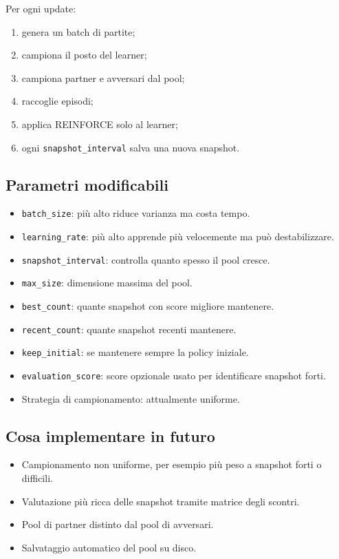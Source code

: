 \documentclass[11pt,a4paper]{article}
\begin{document}
Per ogni update:

\begin{enumerate}
  \item genera un batch di partite;
  \item campiona il posto del learner;
  \item campiona partner e avversari dal pool;
  \item raccoglie episodi;
  \item applica REINFORCE solo al learner;
  \item ogni \texttt{snapshot\_interval} salva una nuova snapshot.
\end{enumerate}

\subsection{Parametri modificabili}

\begin{itemize}
  \item \texttt{batch\_size}: più alto riduce varianza ma costa tempo.
  \item \texttt{learning\_rate}: più alto apprende più velocemente ma può
  destabilizzare.
  \item \texttt{snapshot\_interval}: controlla quanto spesso il pool cresce.
  \item \texttt{max\_size}: dimensione massima del pool.
  \item \texttt{best\_count}: quante snapshot con score migliore mantenere.
  \item \texttt{recent\_count}: quante snapshot recenti mantenere.
  \item \texttt{keep\_initial}: se mantenere sempre la policy iniziale.
  \item \texttt{evaluation\_score}: score opzionale usato per identificare
  snapshot forti.
  \item Strategia di campionamento: attualmente uniforme.
\end{itemize}

\subsection{Cosa implementare in futuro}

\begin{itemize}
  \item Campionamento non uniforme, per esempio più peso a snapshot forti o
  difficili.
  \item Valutazione più ricca delle snapshot tramite matrice degli scontri.
  \item Pool di partner distinto dal pool di avversari.
  \item Salvataggio automatico del pool su disco.
\end{itemize}
\end{document}
